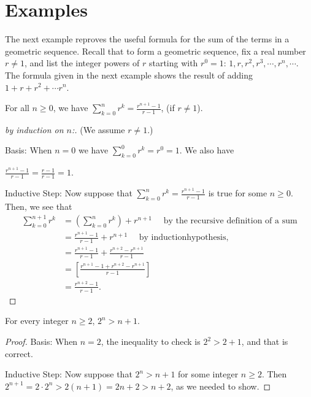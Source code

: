 \section{Examples}
The next example reproves the useful formula for the sum of the terms in a geometric
sequence. Recall that to form a geometric sequence, fix a real number $r\not=1$, and list
the integer powers of $r$ starting with $r^0=1$: $1,r,r^2,r^3,\cdots, r^n,\cdots$.
The formula given in the next example shows the result of adding
$1+r+r^2+\cdots r^n$.

\begin{exmp} For all $n\geq 0$, we have
$\displaystyle{\sum_{k=0}^n r^k = \frac{r^{n+1}-1}{r-1}}$, (if $r\not=1$).

\begin{proof}[by induction on $n$:] (We assume $r\not=1$.)

\textsf{Basis:}
When $n=0$ we have 
$\displaystyle{\sum_{k=0}^0 r^k = r^0 = 1}$. We also have 

$\displaystyle \frac{r^{n+1}-1}{r-1} = \frac{r-1}{r-1}=1$.


\textsf{Inductive Step:} 
Now suppose that  $\displaystyle \sum_{k=0}^n r^k = \frac{r^{n+1}-1}{r-1}$ is true for some $n\geq 0$.
Then, we see that
\begin{align*}
 \sum_{k=0}^{n+1} r^k &= \left(\sum_{k=0}^n r^k\right) + r^{n+1}\quad
                              \text{ by the recursive definition of a sum} \\
                      &= \frac{r^{n+1}-1}{r-1} + r^{n+1}\quad \text{ by inductionhypothesis}, \\
                      &= \frac{r^{n+1}-1}{r-1}+\frac{r^{n+2}-r^{n+1}}{r-1}  \\
                      &= \left[\frac{r^{n+1}-1+r^{n+2}-r^{n+1}}{r-1}\right]  \\
                      &= \frac{r^{n+2}-1}{r-1}.
\end{align*}
\end{proof}
\end{exmp}

\begin{exmp} For every integer $n\geq 2$, $2^n>n+1$.
\begin{proof}
 \textsf{Basis:} When $n=2$, the inequality to check is $2^2>2+1$, and that
 is correct.
 
 \textsf{Inductive Step:} Now suppose that $2^n>n+1$ for some integer $n\geq 2$.
 Then $2^{n+1} = 2\cdot 2^n> 2(n+1) = 2n + 2 >n+2$, as we needed to show.
\end{proof}
\end{exmp}

